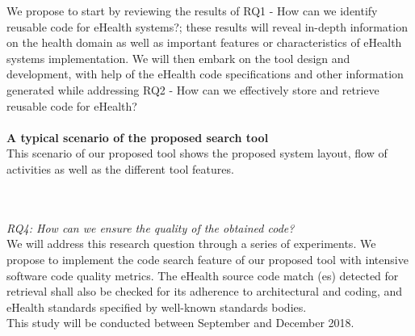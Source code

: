 \documentclass[a4paper]{article}
\begin{document}
We propose to start by reviewing the results of RQ1 - How can we identify reusable code for eHealth systems?; these results will reveal in-depth information on the health domain as well as important features or characteristics of eHealth systems implementation. We will then embark on the tool design and development, with help of the eHealth code specifications and other information generated while addressing RQ2 - How can we effectively store and retrieve reusable code for eHealth? \\ \\
\textbf{A typical scenario of the proposed search tool} \\
This scenario of our proposed tool shows the proposed system layout, flow of activities as well as the different tool features. 


\\ \\ \vspace{100pt}
\textit{RQ4: How can we ensure the quality of the obtained code?} \\
We will address this research question through a series of experiments. We propose to implement the code search feature of our proposed tool with  intensive software code quality metrics. The eHealth source code match (es) detected for retrieval shall also be checked for its adherence to architectural and coding, and eHealth standards specified by well-known standards bodies. \\This study will be conducted between September and December 2018.
\vspace{-10pt}
\end{document}
